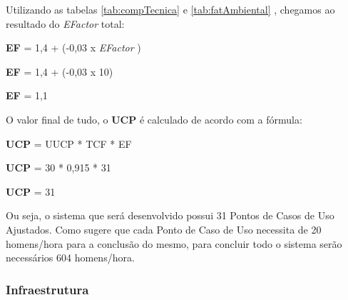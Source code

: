 	Utilizando as tabelas \ref{tab:compTecnica} e \ref{tab:fatAmbiental} , chegamos ao resultado do \textit{EFactor} total:
	\begin{center}
		\textbf{EF} = 1,4 + (-0,03 x \textit{EFactor} )

		\textbf{EF} = 1,4 + (-0,03 x 10)

		\textbf{EF} = 1,1
	\end{center}

	O valor final de tudo, o \textbf{UCP} é calculado de acordo com a fórmula:
	\begin{center}
		\textbf{UCP} = UUCP * TCF * EF

		\textbf{UCP} = 30 * 0,915 * 31

		\textbf{UCP} = 31
	\end{center}


	Ou seja, o sistema que será desenvolvido possui 31 Pontos de Casos de Uso Ajustados. Como \cite{karner1993resource} sugere que cada Ponto de Caso de Uso necessita de 20 homens/hora para a conclusão do mesmo, para concluir todo o sistema serão necessários 604 homens/hora.

	\subsubsection{Infraestrutura}

